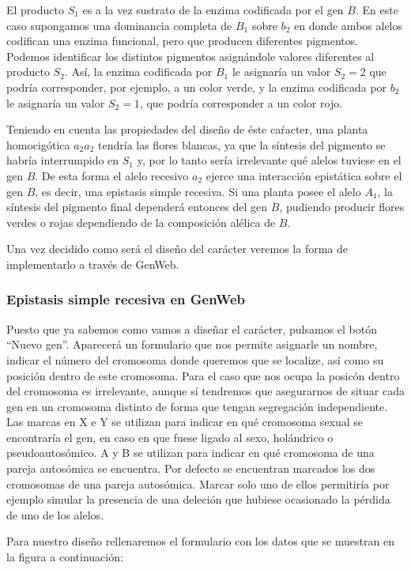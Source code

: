 \documentclass[a4paper]{article}
\begin{document}
El producto $S_1$ es a la vez sustrato de la enzima codificada por el gen $B$. En este caso supongamos una dominancia completa de $B_1$ sobre $b_2$ en donde ambos alelos codifican una enzima funcional, pero que producen diferentes pigmentos. Podemos identificar los distintos pigmentos asignándole valores diferentes al producto $S_2$. Así, la enzima codificada por $B_1$ le asignaría un valor $S_2=2$ que podría corresponder, por ejemplo, a un color verde, y la enzima codificada por $b_2$ le asignaría un valor  $S_2=1$, que podría corresponder a un color rojo.

Teniendo en cuenta las propiedades del diseño de éste caŕacter, una planta homocigótica $a_2a_2$ tendría las flores blancas, ya que la síntesis del pigmento se habría interrumpido en $S_1$ y, por lo tanto sería irrelevante qué alelos tuviese en el gen $B$. De esta forma el alelo recesivo $a_2$ ejerce una interacción epistática sobre el gen $B$, es decir, una epistasis simple recesiva. Si una planta posee el alelo $A_1$, la síntesis del pigmento final dependerá entonces del gen $B$, pudiendo producir flores verdes o rojas dependiendo de la composición alélica de $B$.

Una vez decidido como será el diseño del carácter veremos la forma de implementarlo a través de GenWeb.

\subsubsection{Epistasis simple recesiva en GenWeb}

Puesto que ya sabemos como vamos a diseñar el carácter, pulsamos el botón ``Nuevo gen''. Aparecerá un formulario que nos permite asignarle un nombre, indicar el número del cromosoma donde queremos que se localize, así como su posición dentro de este cromosoma. Para el caso que nos ocupa la posicón dentro del cromosoma es irrelevante, aunque sí tendremos que asegurarnos de situar cada gen en un cromosoma distinto de forma que tengan segregación independiente. Las marcas en X e Y se utilizan para indicar en qué cromosoma sexual se encontraría el gen, en caso en que fuese ligado al sexo, holándrico o pseudoautosómico. A y B se utilizan para indicar en qué cromosoma de una pareja autosómica se encuentra. Por defecto se encuentran marcados los dos cromosomas de una pareja autosómica. Marcar solo uno de ellos permitiría por ejemplo simular la presencia de una deleción que hubiese ocasionado la pérdida de uno de los alelos.

Para nuestro diseño rellenaremos el formulario con los datos que se muestran en la figura a continuación:
\end{document}
